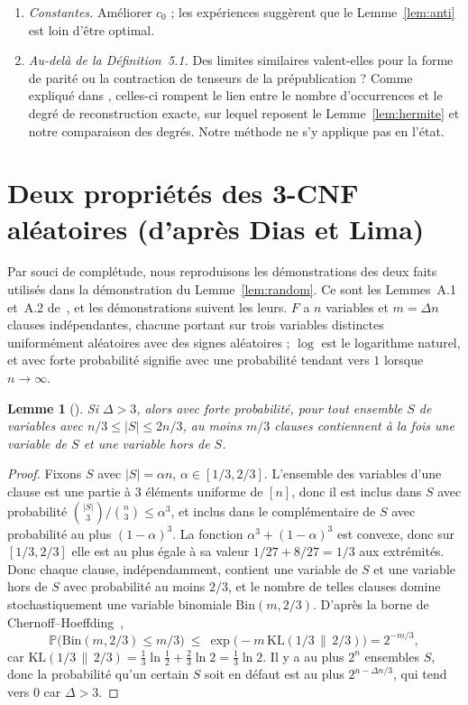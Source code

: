 \documentclass[11pt,a4paper]{article}
\newtheorem{lemma}[theorem]{Lemme}
\theoremstyle{definition}
\theoremstyle{remark}
\newcommand{\PP}{\mathbb{P}}
\begin{document}
\begin{enumerate}
 sorte que le Théorème~\ref{thm:general} soit vérifié par machine sans hypothèse, et
 supprimer l'hypothèse $n\le M$ des énoncés Lean.
\item \emph{Constantes.} Améliorer $c_0$ ; les expériences suggèrent que le
 Lemme~\ref{lem:anti} est loin d'être optimal.
\item \emph{Au-delà de la Définition~5.1.} Des limites similaires valent-elles pour la forme
 de parité ou la contraction de tenseurs de la prépublication ? Comme expliqué dans
 \cite[Section~5.1]{DL}, celles-ci rompent le lien entre le nombre d'occurrences et le degré
 de reconstruction exacte, sur lequel reposent le Lemme~\ref{lem:hermite} et notre
 comparaison des degrés. Notre méthode ne s'y applique pas en l'état.
\end{enumerate}

\appendix
\section{Deux propriétés des 3-CNF aléatoires (d'après Dias et Lima)}\label{app:random}

Par souci de complétude, nous reproduisons les démonstrations des deux faits utilisés dans
la démonstration du Lemme~\ref{lem:random}. Ce sont les Lemmes~A.1 et~A.2 de~\cite{DL}, et
les démonstrations suivent les leurs. $F$ a $n$ variables et $m=\Delta n$ clauses
indépendantes, chacune portant sur trois variables distinctes uniformément aléatoires avec
des signes aléatoires ; $\log$ est le logarithme naturel, et \og avec forte probabilité\fg{}
signifie avec une probabilité tendant vers $1$ lorsque $n\to\infty$.

\begin{lemma}[{\cite[Lemme~A.1]{DL}}]\label{lem:A1}
Si $\Delta>3$, alors avec forte probabilité, pour tout ensemble $S$ de variables avec
$n/3\le|S|\le2n/3$, au moins $m/3$ clauses contiennent à la fois une variable de $S$ et une
variable hors de $S$.
\end{lemma}

\begin{proof}
Fixons $S$ avec $|S|=\alpha n$, $\alpha\in[1/3,2/3]$. L'ensemble des variables d'une clause
est une partie à $3$ éléments uniforme de $[n]$, donc il est inclus dans $S$ avec
probabilité $\binom{|S|}{3}/\binom n3\le\alpha^3$, et inclus dans le complémentaire de $S$
avec probabilité au plus $(1-\alpha)^3$. La fonction $\alpha^3+(1-\alpha)^3$ est convexe,
donc sur $[1/3,2/3]$ elle est au plus égale à sa valeur $1/27+8/27=1/3$ aux extrémités.
Donc chaque clause, indépendamment, contient une variable de $S$ et une variable hors de $S$
avec probabilité au moins $2/3$, et le nombre de telles clauses domine stochastiquement une
variable binomiale $\mathrm{Bin}(m,2/3)$. D'après la borne de
Chernoff--Hoeffding~\cite[Théorème~1]{Hoe63},
\[
\PP\bigl(\mathrm{Bin}(m,2/3)\le m/3\bigr)\ \le\ \exp\bigl(-m\,\mathrm{KL}(1/3\,\|\,2/3)\bigr)
=2^{-m/3},
\]
car $\mathrm{KL}(1/3\,\|\,2/3)=\frac13\ln\frac12+\frac23\ln2=\frac13\ln2$. Il y a au plus
$2^n$ ensembles $S$, donc la probabilité qu'un certain $S$ soit en défaut est au plus
$2^{n-\Delta n/3}$, qui tend vers $0$ car $\Delta>3$.
\end{proof}
\end{document}

